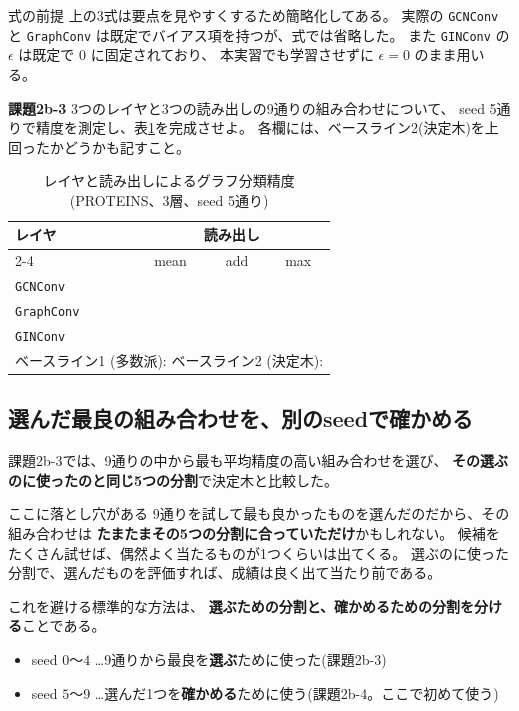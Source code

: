 \documentclass[11pt,a4paper]{jsarticle}
\begin{document}
\begin{itembox}[l]{式の前提}
上の3式は要点を見やすくするため簡略化してある。
実際の \verb|GCNConv| と \verb|GraphConv| は既定でバイアス項を持つが、式では省略した。
また \verb|GINConv| の $\epsilon$ は既定で $0$ に固定されており、
本実習でも学習させずに $\epsilon=0$ のまま用いる。
\end{itembox}

\begin{screen}
\textbf{課題2b-3} \quad 3つのレイヤと3つの読み出しの9通りの組み合わせについて、
seed 5通りで精度を測定し、表\ref{tab:graph}を完成させよ。
各欄には、ベースライン2(決定木)を上回ったかどうかも記すこと。
\end{screen}

\begin{table}[h]
\caption{レイヤと読み出しによるグラフ分類精度(PROTEINS、3層、seed 5通り)}
\label{tab:graph}
\begin{center}
\begin{tabular}{|l||p{3.0cm}|p{3.0cm}|p{3.0cm}|}
\hline
\multirow{2}{*}{レイヤ} & \multicolumn{3}{c|}{読み出し} \\
\cline{2-4}
 & \multicolumn{1}{c|}{mean} & \multicolumn{1}{c|}{add} & \multicolumn{1}{c|}{max} \\
\hline\hline
\verb|GCNConv|   & & & \\
\hline
\verb|GraphConv| & & & \\
\hline
\verb|GINConv|   & & & \\
\hline
\hline
\multicolumn{4}{|l|}{ベースライン1 (多数派): \hspace{3cm} ベースライン2 (決定木): } \\
\hline
\end{tabular}
\end{center}
\end{table}

\subsection{選んだ最良の組み合わせを、別のseedで確かめる}

課題2b-3では、9通りの中から最も平均精度の高い組み合わせを選び、
\textbf{その選ぶのに使ったのと同じ5つの分割}で決定木と比較した。

\begin{itembox}[l]{ここに落とし穴がある}
9通りを試して最も良かったものを選んだのだから、その組み合わせは
\textbf{たまたまその5つの分割に合っていただけ}かもしれない。
候補をたくさん試せば、偶然よく当たるものが1つくらいは出てくる。
選ぶのに使った分割で、選んだものを評価すれば、成績は良く出て当たり前である。

これを避ける標準的な方法は、
\textbf{選ぶための分割と、確かめるための分割を分ける}ことである。

\begin{itemize}
\item seed $0$〜$4$ \dots 9通りから最良を\textbf{選ぶ}ために使った(課題2b-3)
\item seed $5$〜$9$ \dots 選んだ1つを\textbf{確かめる}ために使う(課題2b-4。ここで初めて使う)
\end{itemize}
\end{itembox}
\end{document}
